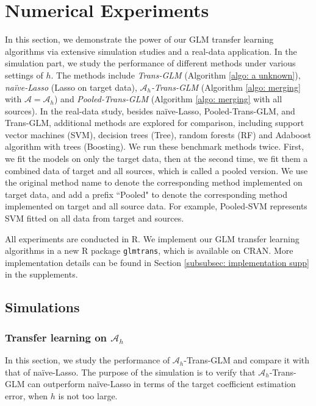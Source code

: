 \documentclass[12pt]{article}
\newcommand{\ma}{\mathcal{A}}
\newcommand{\mah}{\mathcal{A}_h}
\newcommand{\<}{\langle}
\renewcommand{\>}{\rangle}
\begin{document}
\section{Numerical Experiments}\label{sec:numerical}
In this section, we demonstrate the power of our GLM transfer learning algorithms via extensive simulation studies and a real-data application. In the simulation part, we study the performance of different methods under various settings of $h$. The methods include \textit{Trans-GLM} (Algorithm \ref{algo: a unknown}), \textit{na\"ive-Lasso} (Lasso on target data), \textit{$\mah$-Trans-GLM} (Algorithm \ref{algo: merging} with $\ma = \mah$) and \textit{Pooled-Trans-GLM} (Algorithm \ref{algo: merging} with all sources). In the real-data study, besides na\"ive-Lasso, Pooled-Trans-GLM, and Trans-GLM, additional methods are explored for comparison, including support vector machines (SVM), decision trees (Tree), random forests (RF) and Adaboost algorithm with trees (Boosting). We run these benchmark methods twice. First, we fit the models on only the target data, then at the second time, we fit them a combined data of target and all sources, which is called a pooled version. We use the original method name to denote the corresponding method implemented on target data, and add a prefix ``Pooled" to denote the corresponding method implemented on target and all source data. For example, Pooled-SVM represents SVM fitted on all data from target and sources.

All experiments are conducted in R. We implement our GLM transfer learning algorithms in a new R package \texttt{glmtrans}, which is available on CRAN. More implementation details can be found in Section \ref{subsubsec: implementation supp} in the supplements.
%
\subsection{Simulations}\label{subsec:simulations}

\subsubsection{Transfer learning on $\mah$}\label{subsubsec: oracle}
In this section, we study the performance of $\mah$-Trans-GLM and compare it with that of na\"ive-Lasso. The purpose of the simulation is to verify that $\mah$-Trans-GLM can outperform na\"ive-Lasso in terms of the target coefficient estimation error, when $h$ is not too large.
\end{document}
